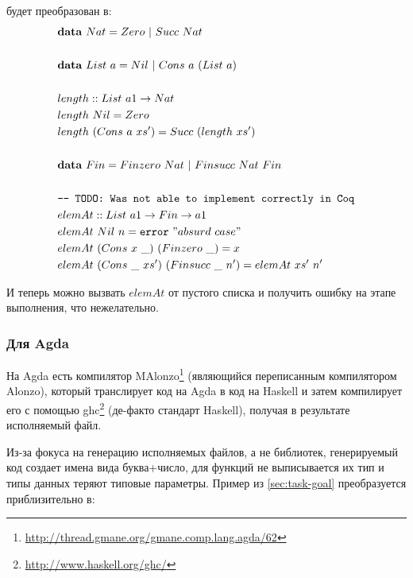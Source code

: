 будет преобразован в:
\begin{align*}
&\mathbf{data}\ Nat = Zero\ |\ Succ\ Nat\\
\\
&\mathbf{data}\ List\ a = Nil\ |\ Cons\ a\ (List\ a)\\
\\
&length :: List\ a1 \rightarrow Nat\\
&length\ Nil = Zero\\
&length\ (Cons\ a\ xs') = Succ\ (length\ xs')\\
\\
&\mathbf{data}\ Fin = Finzero\ Nat\ |\ Finsucc\ Nat\ Fin\\
\\
&\texttt{--- TODO: Was not able to implement correctly in Coq}\\
&elemAt :: List\ a1 \rightarrow Fin \rightarrow a1\\
&elemAt\ Nil\ n = \texttt{error}\ "absurd\ case"\\
&elemAt\ (Cons\ x\ \_)\ (Finzero\ \_) = x\\
&elemAt\ (Cons\ \_\ xs')\ (Finsucc\ \_\ n') = elemAt\ xs'\ n'
\end{align*}

И теперь можно вызвать \(elemAt\) от пустого списка и получить ошибку на
этапе выполнения, что нежелательно.

\subsubsection{Для Agda}

На Agda есть компилятор
MAlonzo\footnote{\url{http://thread.gmane.org/gmane.comp.lang.agda/62}}
(являющийся переписанным компилятором Alonzo\cite{Ben07}), который транслирует
код на Agda в код на Haskell и затем компилирует его с помощью
ghc\footnote{\url{http://www.haskell.org/ghc/}} (де-факто стандарт Haskell),
получая в результате исполняемый файл.

Из-за фокуса на генерацию исполняемых файлов, а не библиотек,
генерируемый код создает имена вида буква+число, для функций
не выписывается их тип и типы данных теряют типовые параметры.
Пример из \ref{sec:task-goal} преобразуется приблизительно в:

